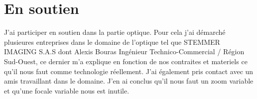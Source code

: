 \section{En soutien}

J'ai participer en soutien dans la partie optique.\newline
Pour cela j'ai démarché plusieures entreprises dans le domaine de l'optique tel que STEMMER IMAGING S.A.S dont Alexis Bouras Ingénieur Technico-Commercial / Région Sud-Ouest, ce dernier m'a explique en fonction de nos contraites et materiels ce qu'il nous faut comme technologie réellement. J'ai également pris contact avec un amis travaillant dans le domaine. \newline
J'en ai conclus qu'il nous faut un zoom variable et qu'une focale variable nous est inutile.


